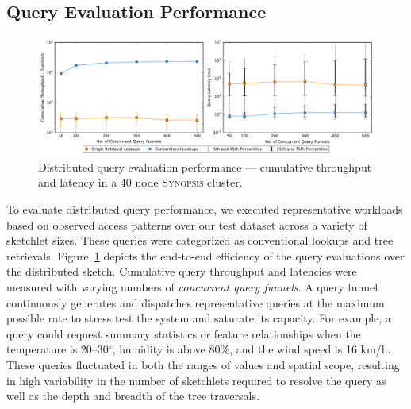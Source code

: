 \subsection{Query Evaluation Performance}
\begin{figure}
    \centerline{\includegraphics[width=\linewidth]{figures/query_benchmark_both.pdf}}
    \caption{Distributed query evaluation performance --- cumulative throughput and latency in a 40 node \textsc{Synopsis} cluster.}
    \label{fig:dist-query}
\end{figure}
To evaluate distributed query performance, we executed representative workloads based on observed access patterns over our test dataset across a variety of sketchlet sizes. These queries were categorized as conventional lookups and tree retrievals.  Figure~\ref{fig:dist-query} depicts the end-to-end efficiency of the query evaluations over the distributed sketch.
Cumulative query throughput and latencies were measured with varying numbers of \emph{concurrent query funnels}.
A query funnel continuously generates and dispatches representative queries at the maximum possible rate to stress test the system and saturate its capacity. For example, a query could request summary statistics or feature relationships when the temperature is 20--30$^{\circ}$, humidity is above 80\%, and the wind speed is 16 km/h.
These queries fluctuated in both the ranges of values and spatial scope, resulting in high variability in the number of sketchlets required to resolve the query as well as the depth and breadth of the tree traversals.

